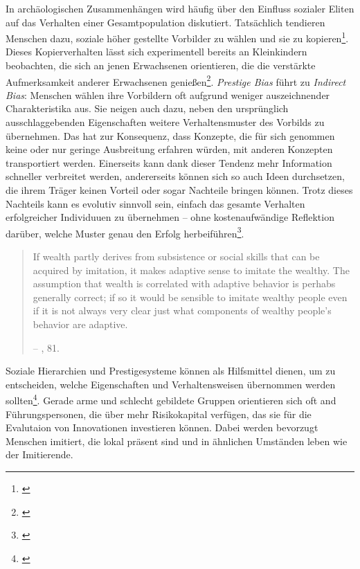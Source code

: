 \documentclass[openany,twoside,twocolumn]{book}
\let\rmarkdownfootnote\footnote%
\def\footnote{\protect\rmarkdownfootnote}
\begin{document}
In archäologischen Zusammenhängen wird häufig über den Einfluss sozialer
Eliten auf das Verhalten einer Gesamtpopulation diskutiert. Tatsächlich
tendieren Menschen dazu, soziale höher gestellte Vorbilder zu wählen und
sie zu kopieren\footnote{\textcite{henrich_evolution_2001}}. Dieses
Kopierverhalten lässt sich experimentell bereits an Kleinkindern
beobachten, die sich an jenen Erwachsenen orientieren, die die
verstärkte Aufmerksamkeit anderer Erwachsenen genießen\footnote{\textcite{chudek_prestige-biased_2012}}.
\emph{Prestige Bias} führt zu \emph{Indirect Bias}: Menschen wählen ihre
Vorbildern oft aufgrund weniger auszeichnender Charakteristika aus. Sie
neigen auch dazu, neben den ursprünglich ausschlaggebenden Eigenschaften
weitere Verhaltensmuster des Vorbilds zu übernehmen. Das hat zur
Konsequenz, dass Konzepte, die für sich genommen keine oder nur geringe
Ausbreitung erfahren würden, mit anderen Konzepten transportiert werden.
Einerseits kann dank dieser Tendenz mehr Information schneller
verbreitet werden, andererseits können sich so auch Ideen durchsetzen,
die ihrem Träger keinen Vorteil oder sogar Nachteile bringen können.
Trotz dieses Nachteils kann es evolutiv sinnvoll sein, einfach das
gesamte Verhalten erfolgreicher Individuuen zu übernehmen -- ohne
kostenaufwändige Reflektion darüber, welche Muster genau den Erfolg
herbeiführen\footnote{\textcite{smith_cultural_1992}}.

\begin{quote}
If wealth partly derives from subsistence or social skills that can be
acquired by imitation, it makes adaptive sense to imitate the wealthy.
The assumption that wealth is correlated with adaptive behavior is
perhabs generally correct; if so it would be sensible to imitate wealthy
people even if it is not always very clear just what components of
wealthy people's behavior are adaptive.

-- \textcite{smith_cultural_1992}, 81.
\end{quote}

Soziale Hierarchien und Prestigesysteme können als Hilfsmittel dienen,
um zu entscheiden, welche Eigenschaften und Verhaltensweisen übernommen
werden sollten\footnote{\textcite{rogers_diffusion_1983}}. Gerade arme
und schlecht gebildete Gruppen orientieren sich oft and
Führungspersonen, die über mehr Risikokapital verfügen, das sie für die
Evalutaion von Innovationen investieren können. Dabei werden bevorzugt
Menschen imitiert, die lokal präsent sind und in ähnlichen Umständen
leben wie der Imitierende.
\end{document}
